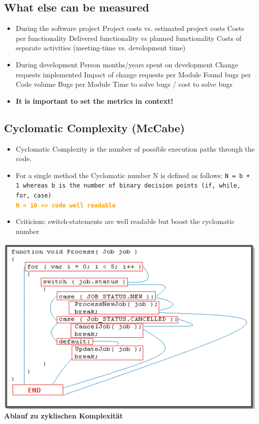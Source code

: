 \documentclass[10pt]{article}
\begin{document}
	\subsection{What else can be measured}
	\begin{itemize}
		\item During the software project
			\subitem Project costs vs. estimated project costs
			\subitem Costs per functionality
			\subitem Delivered functionality vs planned functionality
			\subitem Costs of separate activities (meeting-time vs. development time)
		\item During development
			\subitem Person months/years spent on development 
			\subitem Change requests implemented
			\subitem Impact of change requests per Module 
			\subitem Found bugs per Code volume
			\subitem Bugs per Module
			\subitem Time to solve bugs / cost to solve bugs
		\item \textbf{It is important to set the metrics in context!}
	\end{itemize}
	
	\subsection{Cyclomatic Complexity (McCabe)}
	\begin{itemize}
		\item Cyclomatic Complexity is the number of possible execution paths through the code.
		\item For a single method the Cyclomatic number N is defined as follows:
			\subitem \texttt{N = b + 1 whereas b is the number of binary decision points (if, while, for, case) 
			\\
			\textcolor{orange}{\textbf{N < 10 => code well readable}}}
								
		\item Criticism: switch-statements are well readable but boost the cyclomatic number
	\end{itemize}
	\begin{center}
		\includegraphics[scale=0.5]{assets/caclomatic_complexity.png} \\
		\textbf{Ablauf zu zyklischen Komplexität}
	\end{center}
	
\end{document}
